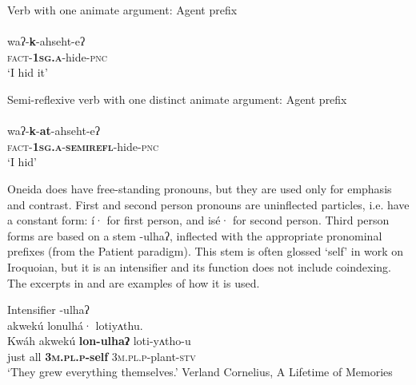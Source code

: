 \documentclass[output=paper]{langscibook}
\begin{document}
\ea%
    \label{ex:oneida:9}
   Verb with one animate argument: Agent prefix\\
  \\
   waʔ-\textbf{k}-ahseht-eʔ\\
  \textsc{fact}-\textbf{\textsc{1sg.a}}-hide-\textsc{pnc}  \\
   \glt  ‘I hid it’
 \z


\ea%
    \label{ex:oneida:10}Semi-reflexive verb with one distinct animate argument: Agent prefix\\
   \\
   waʔ-\textbf{k}-\textbf{at}-ahseht-eʔ\\ 
    \textsc{fact-}\textbf{\textsc{1sg.a}}\textsc{-}\textbf{\textsc{semirefl}}-hide-\textsc{pnc}\\
  \glt ‘I hid’
  \z

Oneida does have free-standing pronouns, but they are used only for emphasis and contrast. First and second person pronouns are uninflected particles, i.e. have a constant form: {í·} for first person, and {isé·} for second person. Third person forms are based on a stem {{}-ulhaʔ}, inflected with the appropriate pronominal prefixes (from the Patient paradigm). This stem is often glossed ‘self’ in work on Iroquoian, but it is an intensifier and its function does not include coindexing. The excerpts in  and  are examples of how it is used.
    

  
\ea%
    \label{ex:oneida:11}
    Intensifier {{}-ulhaʔ}\\
      {akwekú} {lonulhá·} {lotiyʌthu.} \\
   Kwáh akwekú \textbf{lon-ulhaʔ}     loti-yʌtho-u\\    
    just  all \textbf{\textsc{3m.pl.p}}\textbf{-self} \textsc{3m.pl.p}-plant-\textsc{stv}\\
    \glt ‘They grew everything themselves.’ Verland Cornelius, {A} {Lifetime} {of} {Memories}
  \z
\end{document}
